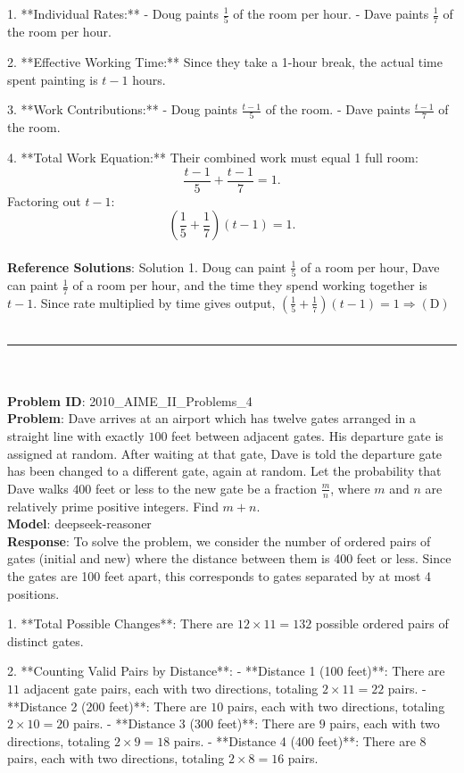 {1. **Individual Rates:**  
   - Doug paints \( \frac{1}{5} \) of the room per hour.  
   - Dave paints \( \frac{1}{7} \) of the room per hour.  

2. **Effective Working Time:**  
   Since they take a 1-hour break, the actual time spent painting is \( t - 1 \) hours.  

3. **Work Contributions:**  
   - Doug paints \( \frac{t - 1}{5} \) of the room.  
   - Dave paints \( \frac{t - 1}{7} \) of the room.  

4. **Total Work Equation:**  
   Their combined work must equal 1 full room:  
   \[
   \frac{t - 1}{5} + \frac{t - 1}{7} = 1.
   \]  
   Factoring out \( t - 1 \):  
   \[
   \left( \frac{1}{5} + \frac{1}{7} \right)(t - 1) = 1.
   \] \\
    \textbf{Reference Solutions}: Solution 1. Doug can paint $\frac{1}{5}$ of a room per hour, Dave can paint $\frac{1}{7}$ of a room per hour, and the time they spend working together is $t-1$.
Since rate multiplied by time gives output, $\left(\frac{1}{5}+\frac{1}{7}\right)\left(t-1\right)=1 \Rightarrow \mathrm{(D)}$ \\
    \vspace{0.3cm} \\
    \hrule \\
    \vspace{0.5cm} \\
    \textbf{Problem ID}: 2010_AIME_II_Problems_4 \\
    \textbf{Problem}: Dave arrives at an airport which has twelve gates arranged in a straight line with exactly $100$ feet between adjacent gates. His departure gate is assigned at random. After waiting at that gate, Dave is told the departure gate has been changed to a different gate, again at random. Let the probability that Dave walks $400$ feet or less to the new gate be a fraction $\frac{m}{n}$, where $m$ and $n$ are relatively prime positive integers. Find $m+n$. \\
    \textbf{Model}: deepseek-reasoner \\
    \textbf{Response}: To solve the problem, we consider the number of ordered pairs of gates (initial and new) where the distance between them is 400 feet or less. Since the gates are 100 feet apart, this corresponds to gates separated by at most 4 positions.

1. **Total Possible Changes**: There are \(12 \times 11 = 132\) possible ordered pairs of distinct gates.

2. **Counting Valid Pairs by Distance**:
   - **Distance 1 (100 feet)**: There are \(11\) adjacent gate pairs, each with two directions, totaling \(2 \times 11 = 22\) pairs.
   - **Distance 2 (200 feet)**: There are \(10\) pairs, each with two directions, totaling \(2 \times 10 = 20\) pairs.
   - **Distance 3 (300 feet)**: There are \(9\) pairs, each with two directions, totaling \(2 \times 9 = 18\) pairs.
   - **Distance 4 (400 feet)**: There are \(8\) pairs, each with two directions, totaling \(2 \times 8 = 16\) pairs.

}
